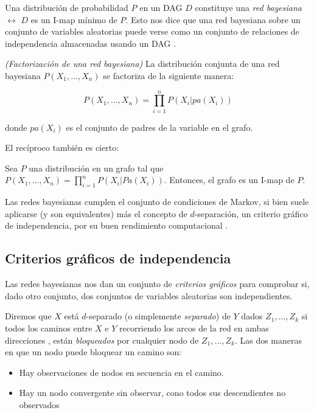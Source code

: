 Una distribución de probabilidad $P$ en un DAG $D$ constituye una {\em red bayesiana} $\leftrightarrow$ $D$ es un 
I-map mínimo de $P$. Esto nos dice que una red bayesiana sobre un conjunto de variables aleatorias puede verse 
como un conjunto de relaciones de independencia almacenadas usando un DAG \cite{i-map}.

\begin{teorema}\emph{(Factorización de una red bayesiana)} 
La distribución conjunta de una red bayesiana $P(X_1, \dots, X_n)$ se factoriza de la siguiente manera:

$$P(X_1, \dots, X_n) = \prod_{i=1}^n P(X_i|pa(X_i))$$

donde $pa(X_i)$ es el conjunto de padres de la variable en el grafo. 
\end{teorema}

El recíproco también es cierto:

\begin{teorema} Sea $P$ una distribución en un grafo tal que $P(X_1, \dots, X_n) = \prod_{i=1}^n P(X_i|Pa(X_i))$. Entonces, el grafo es un I-map de $P$.
\end{teorema}

Las redes bayesianas cumplen el conjunto de condiciones de Markov, si bien suele aplicarse (y son equivalentes) 
más el concepto de $d$-separación, un criterio gráfico de independencia, por su buen rendimiento computacional 
\cite{pearl88}.

\subsection{Criterios gráficos de independencia}

Las redes bayesianas nos dan un conjunto de {\em criterios gráficos} para comprobar si, dado otro conjunto, dos 
conjuntos de variables aleatorias son independientes.

Diremos que $X$ está $d$-separado (o simplemente {\em separado}) de $Y$ dados $Z_1, \dots, Z_k$ si todos los 
caminos entre $X$ e $Y$ recorriendo los arcos de la red en ambas direcciones , están {\em bloqueados} por cualquier 
nodo de $Z_1, \ldots, Z_k$. Las dos maneras en que un nodo puede bloquear un camino son: 

\begin{itemize}
\item Hay observaciones de nodos en secuencia en el camino.
\item Hay un nodo convergente sin observar, cono todos sus descendientes no observados
\end{itemize}

